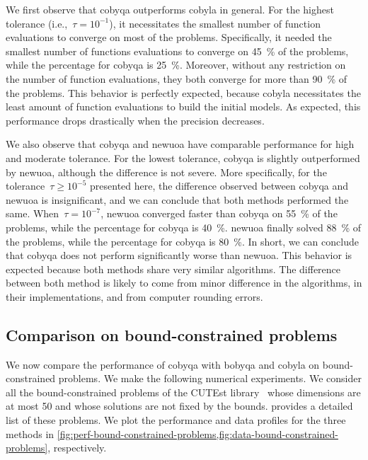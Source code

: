 We first observe that \gls{cobyqa} outperforms \gls{cobyla} in general.
For the highest tolerance (i.e.,~$\tau = 10^{-1}$), it necessitates the smallest number of function evaluations to converge on most of the problems.
Specifically, it needed the smallest number of functions evaluations to converge on \SI{45}{\percent} of the problems, while the percentage for \gls{cobyqa} is \SI{25}{\percent}.
Moreover, without any restriction on the number of function evaluations, they both converge for more than \SI{90}{\percent} of the problems.
This behavior is perfectly expected, because \gls{cobyla} necessitates the least amount of function evaluations to build the initial models.
As expected, this performance drops drastically when the precision decreases.

We also observe that \gls{cobyqa} and \gls{newuoa} have comparable performance for high and moderate tolerance.
For the lowest tolerance, \gls{cobyqa} is slightly outperformed by \gls{newuoa}, although the difference is not severe.
More specifically, for the tolerance~$\tau \ge 10^{-5}$ presented here, the difference observed between \gls{cobyqa} and \gls{newuoa} is insignificant, and we can conclude that both methods performed the same.
When~$\tau = 10^{-7}$, \gls{newuoa} converged faster than \gls{cobyqa} on \SI{55}{\percent} of the problems, while the percentage for \gls{cobyqa} is \SI{40}{\percent}.
\Gls{newuoa} finally solved \SI{88}{\percent} of the problems, while the percentage for \gls{cobyqa} is \SI{80}{\percent}.
In short, we can conclude that \gls{cobyqa} does not perform significantly worse than \gls{newuoa}.
This behavior is expected because both methods share very similar algorithms.
The difference between both method is likely to come from minor difference in the algorithms, in their implementations, and from computer rounding errors.

\subsection{Comparison on bound-constrained problems}

We now compare the performance of \gls{cobyqa} with \gls{bobyqa} and \gls{cobyla} on bound-constrained problems.
We make the following numerical experiments.
We consider all the bound-constrained problems of the CUTEst library~\cite{Gould_Orban_Toint_2015} whose dimensions are at most \num{50} and whose solutions are not fixed by the bounds.
 provides a detailed list of these problems.
We plot the performance and data profiles for the three methods in \cref{fig:perf-bound-constrained-problems,fig:data-bound-constrained-problems}, respectively.

